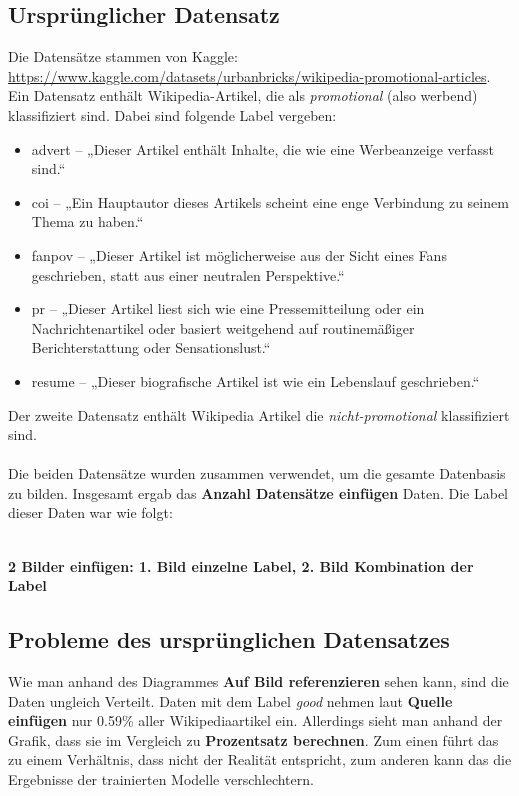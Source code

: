 \documentclass[researchlab,palatino]{AIGpaper}
\begin{document}
\subsection{Ursprünglicher Datensatz}
Die Datensätze stammen von Kaggle: \url{https://www.kaggle.com/datasets/urbanbricks/wikipedia-promotional-articles}. Ein Datensatz enthält Wikipedia-Artikel, die als \emph{promotional} (also werbend) klassifiziert sind. Dabei sind folgende Label vergeben:
\begin{itemize}
    \item advert – „Dieser Artikel enthält Inhalte, die wie eine Werbeanzeige verfasst sind.“
\item coi – „Ein Hauptautor dieses Artikels scheint eine enge Verbindung zu seinem Thema zu haben.“
\item fanpov – „Dieser Artikel ist möglicherweise aus der Sicht eines Fans geschrieben, statt aus einer neutralen Perspektive.“
\item pr – „Dieser Artikel liest sich wie eine Pressemitteilung oder ein Nachrichtenartikel oder basiert weitgehend auf routinemäßiger Berichterstattung oder Sensationslust.“
\item resume – „Dieser biografische Artikel ist wie ein Lebenslauf geschrieben.“
\end{itemize}
Der zweite Datensatz enthält Wikipedia Artikel die \emph{nicht-promotional} klassifiziert sind.
\\ \\
Die beiden Datensätze wurden zusammen verwendet, um die gesamte Datenbasis zu bilden. Insgesamt ergab das \textbf{Anzahl Datensätze einfügen} Daten. Die Label dieser Daten war wie folgt:

\\
\textbf{2 Bilder einfügen: 1. Bild einzelne Label, 2. Bild Kombination der Label}
\\



\subsection{Probleme des ursprünglichen Datensatzes}
Wie man anhand des Diagrammes \textbf{Auf Bild referenzieren} sehen kann, sind die Daten ungleich Verteilt. Daten mit dem Label \textit{good} nehmen laut \textbf{Quelle einfügen} nur 0.59\% aller Wikipediaartikel ein. Allerdings sieht man anhand der Grafik, dass sie im Vergleich zu \textbf{Prozentsatz berechnen}. Zum einen führt das zu einem Verhältnis, dass nicht der Realität entspricht, zum anderen kann das die Ergebnisse der trainierten Modelle verschlechtern.
\end{document}
